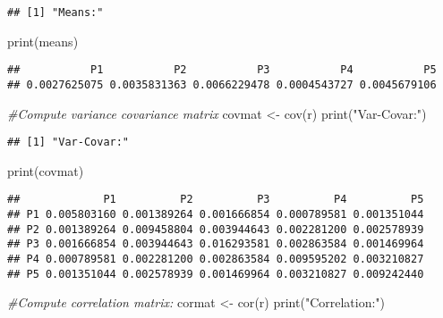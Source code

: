 \documentclass[
]{article}
\newenvironment{Shaded}{\begin{snugshade}}{\end{snugshade}}
\newcommand{\CommentTok}[1]{\textcolor[rgb]{0.56,0.35,0.01}{\textit{#1}}}
\newcommand{\FunctionTok}[1]{\textcolor[rgb]{0.00,0.00,0.00}{#1}}
\newcommand{\NormalTok}[1]{#1}
\newcommand{\OtherTok}[1]{\textcolor[rgb]{0.56,0.35,0.01}{#1}}
\newcommand{\StringTok}[1]{\textcolor[rgb]{0.31,0.60,0.02}{#1}}
\begin{document}
\begin{verbatim}
## [1] "Means:"
\end{verbatim}

\begin{Shaded}
\begin{Highlighting}[]
\FunctionTok{print}\NormalTok{(means)}
\end{Highlighting}
\end{Shaded}

\begin{verbatim}
##           P1           P2           P3           P4           P5 
## 0.0027625075 0.0035831363 0.0066229478 0.0004543727 0.0045679106
\end{verbatim}

\begin{Shaded}
\begin{Highlighting}[]
\CommentTok{\#Compute variance covariance matrix }
\NormalTok{covmat }\OtherTok{\textless{}{-}} \FunctionTok{cov}\NormalTok{(r)}
\FunctionTok{print}\NormalTok{(}\StringTok{"Var{-}Covar:"}\NormalTok{)}
\end{Highlighting}
\end{Shaded}

\begin{verbatim}
## [1] "Var-Covar:"
\end{verbatim}

\begin{Shaded}
\begin{Highlighting}[]
\FunctionTok{print}\NormalTok{(covmat)}
\end{Highlighting}
\end{Shaded}

\begin{verbatim}
##             P1          P2          P3          P4          P5
## P1 0.005803160 0.001389264 0.001666854 0.000789581 0.001351044
## P2 0.001389264 0.009458804 0.003944643 0.002281200 0.002578939
## P3 0.001666854 0.003944643 0.016293581 0.002863584 0.001469964
## P4 0.000789581 0.002281200 0.002863584 0.009595202 0.003210827
## P5 0.001351044 0.002578939 0.001469964 0.003210827 0.009242440
\end{verbatim}

\begin{Shaded}
\begin{Highlighting}[]
\CommentTok{\#Compute correlation matrix: }
\NormalTok{cormat }\OtherTok{\textless{}{-}} \FunctionTok{cor}\NormalTok{(r)}
\FunctionTok{print}\NormalTok{(}\StringTok{"Correlation:"}\NormalTok{)}
\end{Highlighting}
\end{Shaded}
\end{document}
